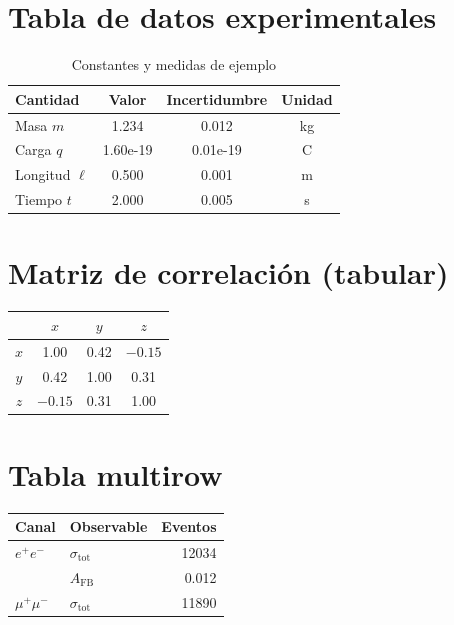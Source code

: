 
\section*{Tabla de datos experimentales}
\begin{table}[h]
\centering
\caption{Constantes y medidas de ejemplo}
\begin{tabular}{l S[table-format=1.3] S[table-format=1.2e1] c}
\toprule
{Cantidad} & {Valor} & {Incertidumbre} & {Unidad} \\
\midrule
Masa $m$ & 1.234 & 0.012 & kg \\
Carga $q$ & 1.60e-19 & 0.01e-19 & C \\
Longitud $\ell$ & 0.500 & 0.001 & m \\
Tiempo $t$ & 2.000 & 0.005 & s \\
\bottomrule
\end{tabular}
\end{table}

\section*{Matriz de correlación (tabular)}
\begin{center}
\begin{tabular}{c|ccc}
\toprule
 & $x$ & $y$ & $z$ \\
\midrule
$x$ & 1.00 & 0.42 & $-0.15$ \\
$y$ & 0.42 & 1.00 & 0.31 \\
$z$ & $-0.15$ & 0.31 & 1.00 \\
\bottomrule
\end{tabular}
\end{center}

\section*{Tabla multirow}
\begin{tabular}{llr}
\toprule
\textbf{Canal} & \textbf{Observable} & \textbf{Eventos} \\
\midrule
$e^+e^-$ & $\sigma_{\mathrm{tot}}$ & 12034 \\
         & $A_{\mathrm{FB}}$ & 0.012 \\
$\mu^+\mu^-$ & $\sigma_{\mathrm{tot}}$ & 11890 \\
\bottomrule
\end{tabular}
